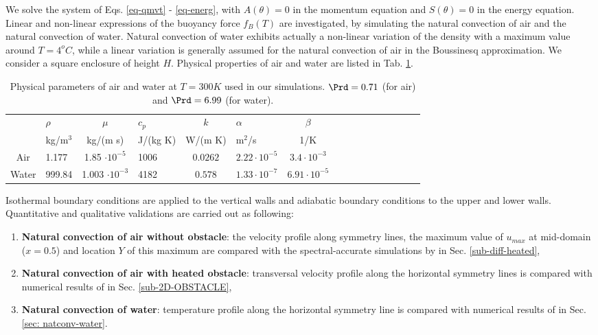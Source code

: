 We solve the system of Eqs. \ref{eq-qmvt} - \ref{eq-energ}, with $A(\theta) = 0$ in the momentum equation and $S(\theta) = 0$ in the energy equation.
Linear and non-linear expressions of the buoyancy force $f_B(T)$ are investigated, by simulating the natural convection of air and the natural convection of water.
Natural convection of water exhibits actually a non-linear variation of the density with a maximum value around $T=4^o C$, while a linear variation is generally assumed for the natural convection of air in the Boussinesq approximation.
We consider a square enclosure of height $H$. 
Physical properties of air and water are listed in Tab. \ref{tab-param-phys-air}.
\begin{table}[!ht]
   \begin{center}
      \begin{tabular}{*{8}{cl}}
         
        & $\rho$ &$ \mu$ & $c_p $ & $k$ & $\alpha $ & $\beta$ \\
        & kg/m$^3$& kg/(m s) & J/(kg K) & W/(m K) & m$^2$/s & 1/K \\
         \hline
        Air & 1.177 & 1.85 $\cdot 10^{-5}$  & 1006 & $0.0262$ & $2.22 \cdot 10^{-5}$ & $3.4 \cdot 10^{-3}$ \\
        Water & 999.84 & 1.003 $\cdot 10^{-3}$  & 4182 & $0.578$ & $1.33 \cdot 10^{-7}$ & $6.91 \cdot 10^{-5}$
      \end{tabular}
   \end{center}
   \caption{Physical parameters of air and water at $T = 300K$ used in our simulations. $\Prd = 0.71$ (for air) and $\Prd = 6.99$ (for water).}
   \label{tab-param-phys-air}
\end{table}

\noindent Isothermal boundary conditions are applied to the vertical walls and adiabatic boundary conditions to the upper and lower walls.
Quantitative and qualitative validations are carried out as following:
\begin{enumerate}[label=(\roman*)]
\item \textbf{Natural convection of air without obstacle}: the velocity profile along symmetry lines, the maximum value of $u_{max}$ at mid-domain ($x=0.5$) and location $Y$ of this maximum  are compared with the spectral-accurate simulations by \cite{LeQuere91} in Sec. \ref{sub-diff-heated}, 
\item \textbf{Natural convection of air with heated obstacle}: transversal velocity profile along the  horizontal symmetry lines is compared with numerical results of \cite{Raluca2013} 
in Sec. \ref{sub-2D-OBSTACLE}, 
\item \textbf{Natural convection of water}: temperature profile along the horizontal symmetry line is compared with numerical results of \cite{Kowalewski-2003} in Sec. \ref{sec: natconv-water}.

\end{enumerate}

